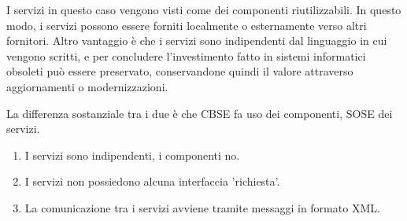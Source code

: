 {    
    I servizi in questo caso vengono visti come dei componenti riutilizzabili. In questo modo, i servizi possono essere forniti localmente o
    esternamente verso altri fornitori. Altro vantaggio è che i servizi sono indipendenti dal linguaggio in cui vengono scritti, e per concludere
    l'investimento fatto in sistemi informatici obsoleti può essere preservato, conservandone quindi il valore attraverso aggiornamenti o
    modernizzazioni.

    La differenza sostanziale tra i due è che CBSE fa uso dei componenti, SOSE dei servizi.
    \begin{enumerate}
        \item I servizi sono indipendenti, i componenti no.
        \item I servizi non possiedono alcuna interfaccia 'richiesta'.
        \item La comunicazione tra i servizi avviene tramite messaggi in formato XML.
    \end{enumerate}
    \newpage
}